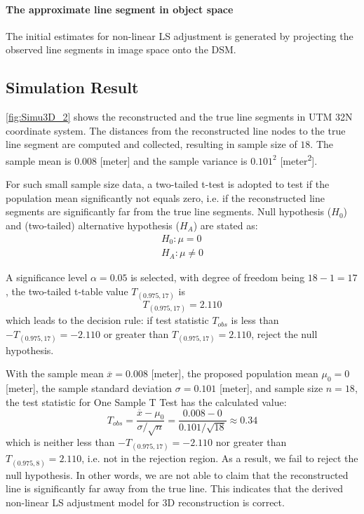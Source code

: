 \paragraph{The approximate line segment in object space}
The initial estimates for non-linear LS adjustment is generated by projecting the observed line segments in image space onto the DSM.

\clearpage

\subsection{Simulation Result}
\label{subsec:simuresult}

\cref{fig:Simu3D_2} shows the reconstructed and the true line segments in UTM 32N coordinate system. The distances from the reconstructed line nodes to the true line segment are computed and collected, resulting in sample size of $18$. The sample mean is $0.008$ [meter] and the sample variance is $0.101^2$ [meter\textsuperscript{2}]. %

For such small sample size data, a two-tailed t-test is adopted to test if the population mean significantly not equals zero, i.e. {if the reconstructed line segments are significantly far from the true line segments}. Null hypothesis ($H_0$) and (two-tailed) alternative hypothesis ($H_A$) are stated as:
\begin{equation*}
\begin{split}
H_0: \mu=0\\
H_A: \mu\neq0
\end{split}
\end{equation*}

A significance level $\alpha=0.05$ is selected, with degree of freedom being $18-1=17$, the two-tailed t-table value $T_{(0.975,17)}$ is
\begin{equation*}
T_{(0.975,17)}=2.110
\end{equation*}
which leads to the decision rule: if test statistic $T_{obs}$ is less than $-T_{(0.975,17)}=-2.110$ or greater than $T_{(0.975,17)}=2.110$, reject the null hypothesis.

With the sample mean $\overline{x}=0.008$ [meter],
the proposed population mean $\mu_0=0$ [meter],
the sample standard deviation $\sigma=0.101$ [meter],
and sample size $n=18$, the test statistic for One Sample T Test has the calculated value:
\begin{equation*}
T_{obs} = \frac{\overline{x}-\mu_0}{\sigma/\sqrt{n}}=\frac{0.008-0}{0.101/\sqrt{18}}\approx0.34
\end{equation*}
which is neither less than $-T_{(0.975,17)}=-2.110$ nor greater than $T_{(0.975,8)}=2.110$, i.e. not in the rejection region. As a result, we fail to reject the null hypothesis. In other words, {we are not able to claim that the reconstructed line is significantly far away from the true line}. This indicates that {the derived non-linear LS adjustment model for 3D reconstruction is correct}.

